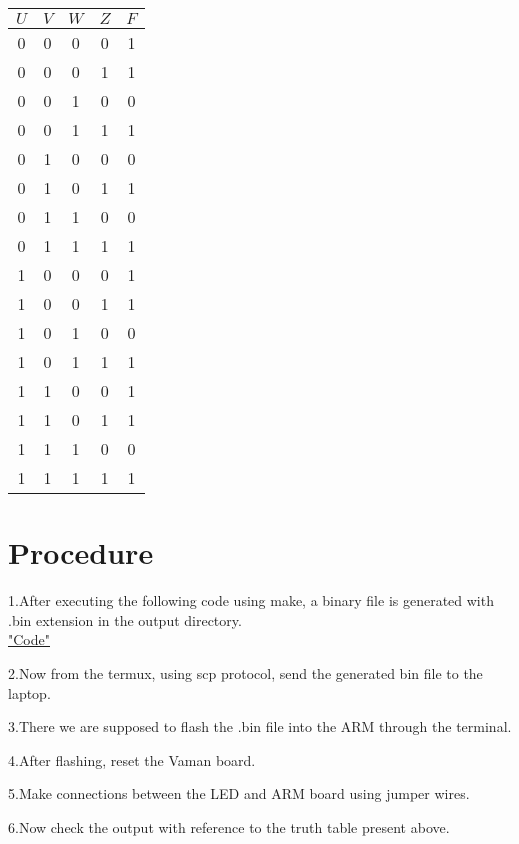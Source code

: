 \documentclass[10pt,twocolumn]{article}
\begin{document}
\begin{center}
    \setlength{\arrayrulewidth}{0.5mm}\setlength{\tabcolsep}{18pt}
	\renewcommand{\arraystretch}{1.5}
    \begin{tabular}{|c|c|c|c|c|}
    \hline 
    \textbf{$U$} & \textbf{$V$} & \textbf{$W$} & \textbf{$Z$} & \textbf{$F$}		\\ \hline
    0 & 0 & 0 & 0 & 1\\
    0 & 0 & 0 & 1 & 1\\
    0 & 0 & 1 & 0 & 0\\
    0 & 0 & 1 & 1 & 1\\
    0 & 1 & 0 & 0 & 0\\
    0 & 1 & 0 & 1 & 1\\
    0 & 1 & 1 & 0 & 0\\
    0 & 1 & 1 & 1 & 1\\
    1 & 0 & 0 & 0 & 1\\
    1 & 0 & 0 & 1 & 1\\
    1 & 0 & 1 & 0 & 0\\
    1 & 0 & 1 & 1 & 1\\
    1 & 1 & 0 & 0 & 1\\
    1 & 1 & 0 & 1 & 1\\
    1 & 1 & 1 & 0 & 0\\
    1 & 1 & 1 & 1 & 1\\ \hline
   	\end{tabular}
\end{center}

\section{Procedure}
\raggedright 1.After executing the following code using make, a binary file is generated with .bin extension in the output directory. \vspace{2mm} \\ 
\centering \underline{\href{https://github.com/BoleManideep/FWC_module1/tree/main/Assignments/assembly/codes}{"Code"}} \\ \vspace{2mm} 
\raggedright 2.Now from the termux, using scp protocol, send the generated bin file to the laptop. \\ \vspace{2mm}
\raggedright 3.There we are supposed to flash the .bin file into the ARM through the terminal.\\ \vspace{2mm}
\raggedright 4.After flashing, reset the Vaman board.\\ \vspace{2mm}
\raggedright 5.Make connections between the LED and ARM board using jumper wires. \\ \vspace{2mm}
\raggedright 6.Now check the output with reference to the truth table present above.
\end{document}
